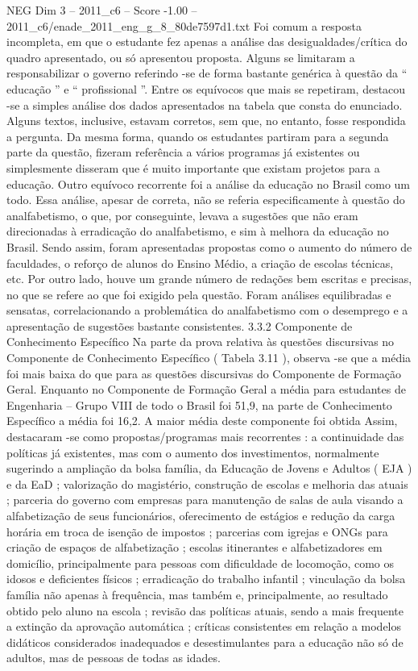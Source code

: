 \begin{textsample}{NEG Dim 3 – 2011\_c6 – Score -1.00 – 2011\_c6/enade\_2011\_eng\_g\_8\_80de7597d1.txt}
Foi comum a resposta incompleta, em que o estudante fez apenas a análise das desigualdades/crítica do quadro apresentado, ou só apresentou proposta.
Alguns se limitaram a responsabilizar o governo referindo -se de forma bastante genérica à questão da “ educação ” e “ profissional ”.
Entre os equívocos que mais se repetiram, destacou -se a simples análise dos dados apresentados na tabela que consta do enunciado.
Alguns textos, inclusive, estavam corretos, sem que, no entanto, fosse respondida a pergunta.
Da mesma forma, quando os estudantes partiram para a segunda parte da questão, fizeram referência a vários programas já existentes ou simplesmente disseram que é muito importante que existam projetos para a educação.
Outro equívoco recorrente foi a análise da educação no Brasil como um todo.
Essa análise, apesar de correta, não se referia especificamente à questão do analfabetismo, o que, por conseguinte, levava a sugestões que não eram direcionadas à erradicação do analfabetismo, e sim à melhora da educação no Brasil.
Sendo assim, foram apresentadas propostas como o aumento do número de faculdades, o reforço de alunos do Ensino Médio, a criação de escolas técnicas, etc.
Por outro lado, houve um grande número de redações bem escritas e precisas, no que se refere ao que foi exigido pela questão.
Foram análises equilibradas e sensatas, correlacionando a problemática do analfabetismo com o desemprego e a apresentação de sugestões bastante consistentes. 3.3.2 Componente de Conhecimento Específico Na parte da prova relativa às questões discursivas no Componente de Conhecimento Específico ( Tabela 3.11 ), observa -se que a média foi mais baixa do que para as questões discursivas do Componente de Formação Geral.
Enquanto no Componente de Formação Geral a média para estudantes de Engenharia – Grupo VIII de todo o Brasil foi 51,9, na parte de Conhecimento Específico a média foi 16,2.
A maior média deste componente foi obtida Assim, destacaram -se como propostas/programas mais recorrentes : a continuidade das políticas já existentes, mas com o aumento dos investimentos, normalmente sugerindo a ampliação da bolsa família, da Educação de Jovens e Adultos ( EJA ) e da EaD ; valorização do magistério, construção de escolas e melhoria das atuais ; parceria do governo com empresas para manutenção de salas de aula visando a alfabetização de seus funcionários, oferecimento de estágios e redução da carga horária em troca de isenção de impostos ; parcerias com igrejas e ONGs para criação de espaços de alfabetização ; escolas itinerantes e alfabetizadores em domicílio, principalmente para pessoas com dificuldade de locomoção, como os idosos e deficientes físicos ; erradicação do trabalho infantil ; vinculação da bolsa família não apenas à frequência, mas também e, principalmente, ao resultado obtido pelo aluno na escola ; revisão das políticas atuais, sendo a mais frequente a extinção da aprovação automática ; críticas consistentes em relação a modelos didáticos considerados inadequados e desestimulantes para a educação não só de adultos, mas de pessoas de todas as idades.

\end{textsample}
